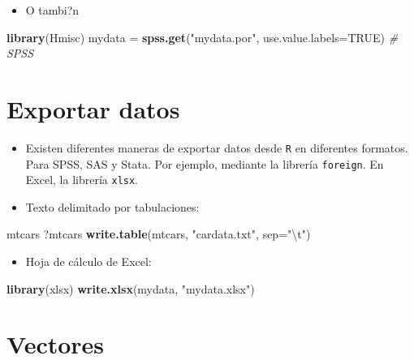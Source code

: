 \documentclass[]{book}
\newenvironment{Shaded}{\begin{snugshade}}{\end{snugshade}}
\newcommand{\KeywordTok}[1]{\textcolor[rgb]{0.13,0.29,0.53}{\textbf{#1}}}
\newcommand{\DataTypeTok}[1]{\textcolor[rgb]{0.13,0.29,0.53}{#1}}
\newcommand{\CharTok}[1]{\textcolor[rgb]{0.31,0.60,0.02}{#1}}
\newcommand{\StringTok}[1]{\textcolor[rgb]{0.31,0.60,0.02}{#1}}
\newcommand{\CommentTok}[1]{\textcolor[rgb]{0.56,0.35,0.01}{\textit{#1}}}
\newcommand{\OtherTok}[1]{\textcolor[rgb]{0.56,0.35,0.01}{#1}}
\newcommand{\NormalTok}[1]{#1}
\providecommand{\tightlist}{%
  \setlength{\itemsep}{0pt}\setlength{\parskip}{0pt}}
\begin{document}
\begin{itemize}
\tightlist
\item
  O tambi?n
\end{itemize}

\begin{Shaded}
\begin{Highlighting}[]
\KeywordTok{library}\NormalTok{(Hmisc)}
\NormalTok{mydata =}\StringTok{ }\KeywordTok{spss.get}\NormalTok{(}\StringTok{"mydata.por"}\NormalTok{, }\DataTypeTok{use.value.labels=}\OtherTok{TRUE}\NormalTok{)  }\CommentTok{# SPSS}
\end{Highlighting}
\end{Shaded}

\section{Exportar datos}\label{exportar-datos}

\begin{itemize}
\item
  Existen diferentes maneras de exportar datos desde \texttt{R} en
  diferentes formatos. Para SPSS, SAS y Stata. Por ejemplo, mediante la
  librería \texttt{foreign}. En Excel, la librería \texttt{xlsx}.
\item
  Texto delimitado por tabulaciones:
\end{itemize}

\begin{Shaded}
\begin{Highlighting}[]
\NormalTok{mtcars}
\NormalTok{?mtcars    }
\KeywordTok{write.table}\NormalTok{(mtcars, }\StringTok{"cardata.txt"}\NormalTok{, }\DataTypeTok{sep=}\StringTok{"}\CharTok{\textbackslash{}t}\StringTok{"}\NormalTok{) }
\end{Highlighting}
\end{Shaded}

\begin{itemize}
\tightlist
\item
  Hoja de cálculo de Excel:
\end{itemize}

\begin{Shaded}
\begin{Highlighting}[]
\KeywordTok{library}\NormalTok{(xlsx)}
\KeywordTok{write.xlsx}\NormalTok{(mydata, }\StringTok{"mydata.xlsx"}\NormalTok{)}
\end{Highlighting}
\end{Shaded}

\section{Vectores}\label{vectores}
\end{document}

